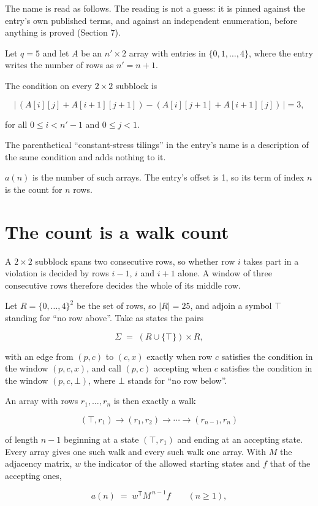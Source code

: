 \documentclass[11pt]{article}
\theoremstyle{definition}
\begin{document}
The name is read as follows. The reading is not a guess: it is pinned against the entry's own published terms, and against an independent enumeration, before anything is proved (Section 7).

Let $q = 5$ and let $A$ be an $n' \times 2$ array with entries in $\{0,1,\dots,4\}$, where the entry writes the number of rows as $n' = n + 1$.

The condition on every $2 \times 2$ subblock is

\[\bigl|\,(A[i][j] + A[i{+}1][j{+}1]) - (A[i][j{+}1] + A[i{+}1][j])\,\bigr| = 3,\]

for all $0 \le i < n'-1$ and $0 \le j < 1$.

The parenthetical ``constant-stress tilings'' in the entry's name is a description of the same condition and adds nothing to it.

$a(n)$ is the number of such arrays. The entry's offset is 1, so its term of index $n$ is the count for $n$ rows.

\section{The count is a walk count}

A $2 \times 2$ subblock spans two consecutive rows, so whether row $i$ takes part in a violation is decided by rows $i-1$, $i$ and $i+1$ alone. A window of three consecutive rows therefore decides the whole of its middle row.

Let $R = \{0,\dots,4\}^{2}$ be the set of rows, so $|R| = 25$, and adjoin a symbol $\top$ standing for ``no row above''. Take as states the pairs

\[\Sigma \;=\; (R \cup \{\top\}) \times R,\]

with an edge from $(p,c)$ to $(c,x)$ exactly when row $c$ satisfies the condition in the window $(p,c,x)$, and call $(p,c)$ accepting when $c$ satisfies the condition in the window $(p,c,\bot)$, where $\bot$ stands for ``no row below''.

An array with rows $r_1,\dots,r_n$ is then exactly a walk

\[(\top,r_1) \to (r_1,r_2) \to \cdots \to (r_{n-1},r_n)\]

of length $n-1$ beginning at a state $(\top,r_1)$ and ending at an accepting state. Every array gives one such walk and every such walk one array. With $M$ the adjacency matrix, $w$ the indicator of the allowed starting states and $f$ that of the accepting ones,

\[a(n) \;=\; w^{\mathsf T} M^{\,n-1} f \qquad (n \ge 1),\]
\end{document}
